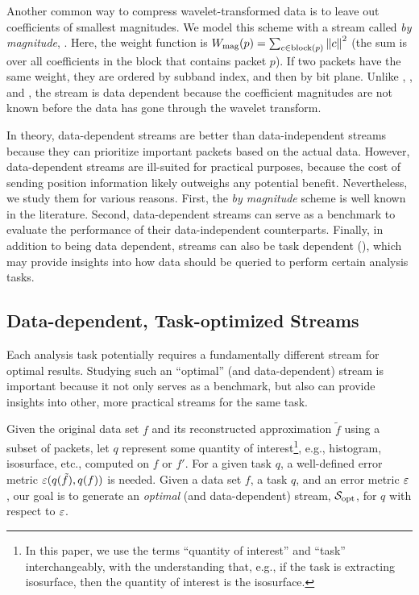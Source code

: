 Another common way to compress wavelet-transformed data is to leave out coefficients of smallest
magnitudes. We model this scheme with a stream called \emph{by magnitude}, \smag. Here, the weight
function is $\wmag(p)=\sum_{c\in \text{block}(p)}\norm{c}^2$ (the sum is over all coefficients in
the block that contains packet $p$). If two packets have the same weight, they are ordered by
subband index, and then by bit plane. Unlike \slvl, \sbit, and \swav, the \smag stream is data
dependent because the coefficient magnitudes are not known before the data has gone through the
wavelet transform.

In theory, data-dependent streams are better than data-independent streams because they can
prioritize important packets based on the actual data. However, data-dependent streams are
ill-suited for practical purposes, because the cost of sending position information likely
outweighs any potential benefit. Nevertheless, we study them for various reasons. First, the
\emph{by magnitude} scheme is well known in the literature. Second, data-dependent streams can serve
as a benchmark to evaluate the performance of their data-independent counterparts. Finally, in
addition to being data dependent, streams can also be task dependent (),
which may provide insights into how data should be queried to perform certain analysis tasks.

\subsection{Data-dependent, Task-optimized Streams} \label{sec:data_dep_streams}

Each analysis task potentially requires a fundamentally different stream for optimal results.
Studying such an ``optimal'' (and data-dependent) stream is important because it not only serves
as a benchmark, but also can provide insights into other, more practical streams for the same task.

Given the original data set $f$ and its reconstructed approximation $\tilde{f}$ using a subset of
packets, let $q$ represent some quantity of interest\footnote{In this paper, we use the terms
``quantity of interest'' and ``task'' interchangeably, with the understanding that, e.g., if the
task is extracting isosurface, then the quantity of interest is the isosurface.}, e.g., histogram,
isosurface, etc., computed on $f$ or $f'$. For a given task $q$, a well-defined error metric
$\err(q(\tilde{f}),q(f))$ is needed. Given a data set $f$, a task $q$, and an error metric $\err$,
our goal is to generate an \emph{optimal} (and data-dependent) stream, $\sopt$, for $q$ with respect
to $\err$.

